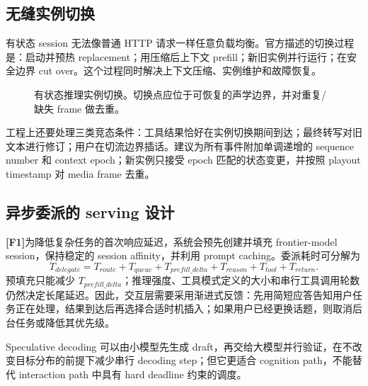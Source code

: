 \documentclass[UTF8,fontset=none,a4paper,10pt]{ctexart}
\newcommand{\FOne}{\textcolor{official}{\textbf{[F1]}}}
\begin{document}
\subsection{无缝实例切换}

有状态 session 无法像普通 HTTP 请求一样任意负载均衡。官方描述的切换过程是：启动并预热 replacement；用压缩后上下文 prefill；新旧实例并行运行；在安全边界 cut over。这个过程同时解决上下文压缩、实例维护和故障恢复。

\begin{figure}[H]
\centering
{}
\caption{有状态推理实例切换。切换点应位于可恢复的声学边界，并对重复/缺失 frame 做去重。}
\end{figure}

工程上还要处理三类竞态条件：工具结果恰好在实例切换期间到达；最终转写对旧文本进行修订；用户在切流边界插话。建议为所有事件附加单调递增的 sequence number 和 context epoch；新实例只接受 epoch 匹配的状态变更，并按照 playout timestamp 对 media frame 去重。

\subsection{异步委派的 serving 设计}

\FOne 为降低复杂任务的首次响应延迟，系统会预先创建并填充 frontier-model session，保持稳定的 session affinity，并利用 prompt caching\cite{zh:openai2026continuous}。委派耗时可分解为
\begin{equation}
T_{delegate}=T_{route}+T_{queue}+T_{prefill\_delta}+T_{reason}+T_{tool}+T_{return}.
\end{equation}
预填充只能减少 $T_{prefill\_delta}$；推理强度、工具模式定义的大小和串行工具调用轮数仍然决定长尾延迟。因此，交互层需要采用渐进式反馈：先用简短应答告知用户任务正在处理，结果到达后再选择合适时机插入；如果用户已经更换话题，则取消后台任务或降低其优先级。

Speculative decoding 可以由小模型先生成 draft，再交给大模型并行验证，在不改变目标分布的前提下减少串行 decoding step\cite{zh:leviathan2023speculative}；但它更适合 cognition path，不能替代 interaction path 中具有 hard deadline 约束的调度。
\end{document}

